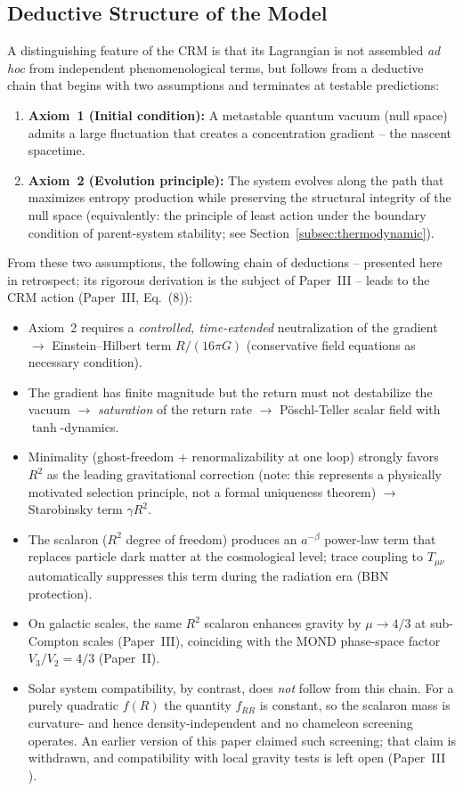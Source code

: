 \documentclass[aps,prd,twocolumn,superscriptaddress,nofootinbib]{revtex4-2}
\begin{document}
\subsection{Deductive Structure of the Model}
\label{subsec:deductive}

A distinguishing feature of the CRM is that its Lagrangian is not assembled \textit{ad hoc} from independent phenomenological terms, but follows from a deductive chain that begins with two assumptions and terminates at testable predictions:

\begin{enumerate}
\item \textbf{Axiom~1 (Initial condition):} A metastable quantum vacuum (null space) admits a large fluctuation that creates a concentration gradient -- the nascent spacetime.
\item \textbf{Axiom~2 (Evolution principle):} The system evolves along the path that maximizes entropy production while preserving the structural integrity of the null space (equivalently: the principle of least action under the boundary condition of parent-system stability; see Section~\ref{subsec:thermodynamic}).
\end{enumerate}

From these two assumptions, the following chain of deductions -- presented here in retrospect; its rigorous derivation is the subject of Paper~III -- leads to the CRM action (Paper~III, Eq.~(8)):
\begin{itemize}
\item Axiom~2 requires a \textit{controlled, time-extended} neutralization of the gradient $\to$ Einstein--Hilbert term $R/(16\pi G)$ (conservative field equations as necessary condition).
\item The gradient has finite magnitude but the return must not destabilize the vacuum $\to$ \textit{saturation} of the return rate $\to$ P\"oschl-Teller scalar field with $\tanh$-dynamics.
\item Minimality (ghost-freedom + renormalizability at one loop) strongly favors $R^2$ as the leading gravitational correction (note: this represents a physically motivated selection principle, not a formal uniqueness theorem) $\to$ Starobinsky term $\gamma R^2$.
\item The scalaron ($R^2$ degree of freedom) produces an $a^{-\beta}$ power-law term that replaces particle dark matter at the cosmological level; trace coupling to $T_{\mu\nu}$ automatically suppresses this term during the radiation era (BBN protection).
\item On galactic scales, the same $R^2$ scalaron enhances gravity by $\mu \to 4/3$ at sub-Compton scales (Paper~III), coinciding with the MOND phase-space factor $V_3/V_2 = 4/3$ (Paper~II).
\item Solar system compatibility, by contrast, does \textit{not} follow from this chain. For a purely quadratic $f(R)$ the quantity $f_{RR}$ is constant, so the scalaron mass is curvature- and hence density-independent and no chameleon screening operates. An earlier version of this paper claimed such screening; that claim is withdrawn, and compatibility with local gravity tests is left open (Paper~III \cite{Geiger2026c}).
\end{itemize}
\end{document}
